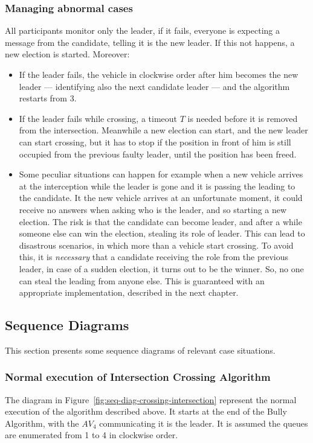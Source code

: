 \documentclass{memoir}
\begin{document}
\subsubsection{Managing abnormal cases}

All participants monitor only the leader, if it fails, everyone is expecting a message from the candidate, telling it is the new leader. If this not happens, a new election is started. Moreover:

\begin{itemize}
	\item If the leader fails, the vehicle in clockwise order after him becomes the new leader --- identifying also the next candidate leader --- and the algorithm restarts from 3.
	\item If the leader fails while crossing, a timeout $T$ is needed before it is removed from the intersection. Meanwhile a new election can start, and the new leader can start crossing, but it has to stop if the position in front of him is still occupied from the previous faulty leader, until the position has been freed.
	\item Some peculiar situations can happen for example when a new vehicle arrives at the interception while the leader is gone and it is passing the leading to the candidate. It the new vehicle arrives at an unfortunate moment, it could receive no answers when asking who is the leader, and so starting a new election. The risk is that the candidate can become leader, and after a while someone else can win the election, stealing its role of leader. This can lead to disastrous scenarios, in which more than a vehicle start crossing. To avoid this, it is \emph{necessary} that a candidate receiving the role from the previous leader, in case of a sudden election, it turns out to be the winner. So, no one can steal the leading from anyone else. This is guaranteed with an appropriate implementation, described in the next chapter.
\end{itemize}

\subsection{Sequence Diagrams}
This section presents some sequence diagrams of relevant case situations.

\subsubsection{Normal execution of Intersection Crossing Algorithm}
The diagram in Figure~\ref{fig:seq-diag-crossing-intersection} represent the normal execution of the algorithm described above. It starts at the end of the Bully Algorithm, with the $AV_4$ communicating it is the leader. It is assumed the queues are enumerated from 1 to 4 in clockwise order.
\end{document}
